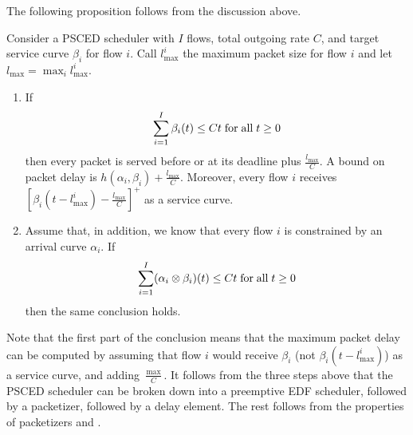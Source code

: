 The following proposition follows from the discussion above.
\begin{proposition}\cite{Changbook}
Consider a PSCED scheduler with $I$ flows, total outgoing rate
$C$, and target service curve $\beta_i$ for flow $i$. Call
$l^{i}_{\max}$ the maximum packet size for flow $i$ and let
$l_{\max}=\max_i l^{i}_{\max}$.
\begin{enumerate}
  \item If
\begin{equation}\mylabel{eq-schedofsced-21}
 \sum_{i=1}^I \beta_i(t) \leq Ct \mfa t \geq 0
\end{equation}
then every packet is served before or at its deadline plus
$\frac{l_{\max}}{C}$. A bound on packet delay is $h(\alpha_i,
\beta_i)+\frac{l_{\max}}{C}$. Moreover, every flow $i$
  receives
  $[\beta_i(t-l^{i}_{\max}) - \frac{l_{\max}}{C}]^+$
  as a service curve.
  \item Assume that, in addition, we know that every flow $i$ is constrained
  by an arrival curve $\alpha_i$. If
  \begin{equation}\mylabel{eq-schedofsced-22}
 \sum_{i=1}^I (\alpha_i \mpc \beta_i)(t) \leq Ct \mfa t \geq 0
\end{equation}
  then the same conclusion holds.
\end{enumerate}
\end{proposition}
Note that the first part of the conclusion means that the maximum
packet delay can be computed by assuming that flow $i$ would
receive $\beta_i$ (not $\beta_i(t-l^{i}_{\max})$) as a service
curve, and adding $\frac{\max}{C}$.
\pr
It follows from the three steps above that the PSCED scheduler can
be broken down into a preemptive EDF scheduler, followed by a
packetizer, followed by a delay element. The rest follows from the
properties of packetizers and .
%
